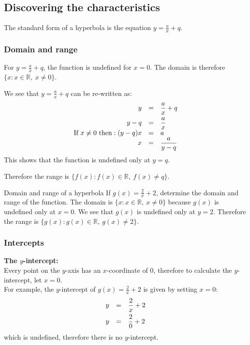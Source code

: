 \subsection*{Discovering the characteristics}  
The standard form of a hyperbola is the equation $y=\frac{a}{x}+q$.

\subsubsection*{Domain and range}

For $y=\frac{a}{x}+q$, the function is undefined for $x=0$. The domain is therefore $\{x:x\in \mathbb{R},~x\ne 0\}$.\par 
We see that $y=\frac{a}{x}+q$ can be re-written as:
\begin{equation*}
\begin{array}{ccl}\hfill y& =& \dfrac{a}{x}+q\hfill \vspace{4pt} \\
 \hfill y-q& =& \dfrac{a}{x}\hfill \\
 \hfill \mbox{If }x \ne  0 \mbox{ then}:(y-q)x& =& a\hfill \\
 \hfill x& =& \dfrac{a}{y-q}\hfill 
\end{array}
\end{equation*}
This shows that the function is undefined only at $y=q$.
\par
Therefore the range is $\{f(x):f(x) \in \mathbb{R},~f(x)\ne q\}$.\par 

\begin{wex}{Domain and range of a hyperbola}
{If $g(x)=\frac{2}{x}+2$, determine the domain and range of the function.}
{
The domain is $\{x:x\in \mathbb{R},~x\ne 0\}$ because $g(x)$ is undefined only at $x=0$.
We see that $g(x)$ is undefined only at $y=2$. Therefore the range is
$\{g(x):g(x) \in \mathbb{R},~g(x)\ne 2\}$.
}
\end{wex}


\subsubsection*{Intercepts}

\textbf{The $y$-intercept:} \\
Every point on the $y$-axis has an $x$-coordinate of $0$, therefore to calculate the $y$-intercept, let $x=0$.\\
For example, the $y$-intercept of $g(x)=\frac{2}{x}+2$ is given by setting $x=0$:
\begin{equation*}
\begin{array}{ccc}\hfill y& =& \dfrac{2}{x}+2\hfill \vspace{4pt}\\
 \hfill y& =& \dfrac{2}{0}+2\hfill 
\end{array}
\end{equation*}
which is undefined, therefore there is no $y$-intercept.\\
\\

